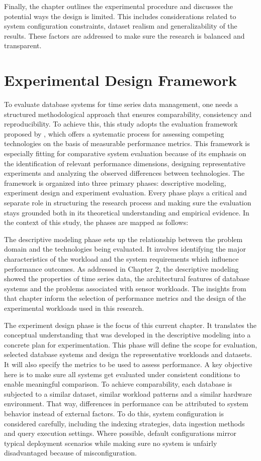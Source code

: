 Finally, the chapter outlines the experimental procedure and discusses the potential ways the design is limited. This includes considerations related to system configuration constraints, dataset realism and generalizability of the results. These factors are addressed to make sure the research is balanced and transparent. 


\section{Experimental Design Framework}
To evaluate database systems for time series data management, one needs a structured methodological approach that ensures comparability, consistency and reproducibility. To achieve this, this study adopts the evaluation framework proposed by \citet{Brown_1996}, which offers a systematic process for assessing competing technologies on the basis of measurable performance metrics. This framework is especially fitting for comparative system evaluation because of its emphasis on the identification of relevant performance dimensions, designing representative experiments and analyzing the observed differences between technologies. The framework is organized into three primary phases: descriptive modeling, experiment design and experiment evaluation. Every phase plays a critical and separate role in structuring the research process and making sure the evaluation stays grounded both in its theoretical understanding and empirical evidence. In the context of this study, the phases are mapped as follows:

The descriptive modeling phase sets up the relationship between the problem domain and the technologies being evaluated. It involves identifying the major characteristics of the workload and the system requirements which influence performance outcomes. As addressed in Chapter 2, the descriptive modeling showed the properties of time series data, the architectural features of database systems and the problems associated with sensor workloads. The insights from that chapter inform the selection of performance metrics and the design of the experimental workloads used in this research. 


The experiment design phase is the focus of this current chapter. It translates the conceptual understanding that was developed in the descriptive modeling into a concrete plan for experimentation. This phase will define the scope for evaluation, selected database systems and design the representative workloads and datasets. It will also specify the metrics to be used to assess performance. A key objective here is to make sure all systems get evaluated under consistent conditions to enable meaningful comparison. To achieve comparability, each database is subjected to a similar dataset, similar workload patterns and a similar hardware environment. That way, differences in performance can be attributed to system behavior instead of external factors. To do this, system configuration is considered carefully, including the indexing strategies, data ingestion methods and query execution settings. Where possible, default configurations mirror typical deployment scenarios while making sure no system is unfairly disadvantaged because of misconfiguration. 


